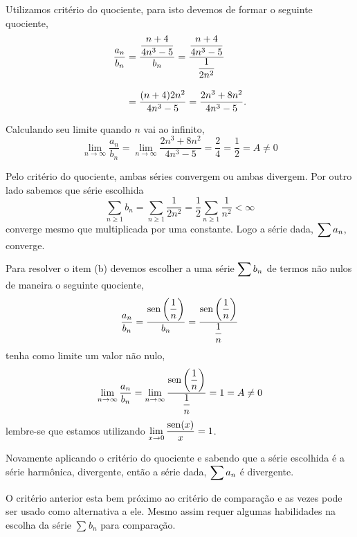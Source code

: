 \solo Utilizamos  crit\'{e}rio do quociente, para isto devemos de formar
o seguinte quociente,
\begin{align*}
\frac{a_n}{b_n}&=\frac{\displaystyle{\frac{n+4}{4n^3-5}}}{b_n}=\frac{\displaystyle{\frac{n+4}{4n^3-5}}}{\displaystyle{\frac{1}{2n^2}}}\\[2ex]
&=\frac{(n+4)2n^2}{4n^3-5}=\frac{2n^3+8n^2}{4n^3-5}.
\end{align*}

Calculando seu limite quando $n$ vai ao infinito,
\begin{equation*}
    \lim_{n\to\infty}\frac{a_n}{b_n}=
    \lim_{n\to\infty}\frac{2n^3+8n^2}{4n^3-5}=\frac{2}{4}=\frac{1}{2}=A\neq
    0
\end{equation*}

Pelo crit\'{e}rio do quociente, ambas s\'{e}ries convergem ou ambas
divergem. Por outro lado sabemos que s\'{e}rie escolhida
\begin{equation*}
\sum_{n\ge 1}b_n =  \sum_{n\ge
1}\frac{1}{2n^2}=\frac{1}{2}\sum_{n\ge 1}\frac{1}{n^2}<\infty
\end{equation*}
converge mesmo que multiplicada por uma constante. Logo a s\'{e}rie
dada, $\displaystyle{\sum a_n}$, converge.

Para resolver o item (b) devemos escolher a uma s\'{e}rie $\displaystyle{\sum
b_n}$ de termos n\~{a}o nulos de maneira o seguinte quociente,
\begin{align*}
    \frac{a_n}{b_n}=\frac{\displaystyle{\operatorname{sen}\left(\frac{1}{n}\right)}}{b_n}=\frac{\displaystyle{\operatorname{sen}\left(\frac{1}{n}\right)}}{\displaystyle{\frac{1}{n}}}
\end{align*}
tenha como limite um valor n\~{a}o nulo,
\begin{equation*}
    \lim_{n\to \infty}\frac{a_n}{b_n}=\lim_{n\to
    \infty}\frac{\displaystyle{\operatorname{sen}\left(\frac{1}{n}\right)}}{\displaystyle{\frac{1}{n}}}=1=A\neq 0
\end{equation*}
lembre-se que estamos utilizando $\displaystyle{\lim_{x\to
0}\frac{\operatorname{sen}(x)}{x}=1}$.

Novamente aplicando o crit\'{e}rio do quociente e sabendo que a s\'{e}rie
escolhida \'{e} a s\'{e}rie harm\^{o}nica, divergente, ent\~{a}o a s\'{e}rie dada,
$\displaystyle{\sum a_n}$ \'{e} divergente.

\begin{obs}
O crit\'{e}rio anterior esta bem  pr\'{o}ximo ao crit\'{e}rio de compara\c{c}\~{a}o e as
vezes pode ser usado como alternativa a ele. Mesmo assim requer
algumas habilidades na escolha da s\'{e}rie $\sum_{}b_{n}$ para
compara\c{c}\~{a}o.
\end{obs}


